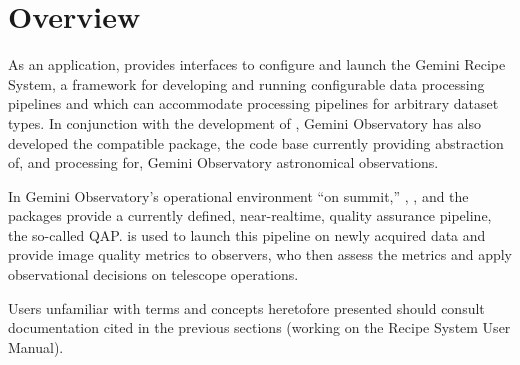 \documentclass[letterpaper,10pt,english]{sphinxmanual}
\begin{document}
\section{Overview}
\label{intro:overview}
As an application,  provides interfaces to configure and launch the
Gemini Recipe System, a framework for developing and running configurable data
processing pipelines and which can accommodate processing pipelines for arbitrary
dataset types. In conjunction with the development of , Gemini
Observatory has also developed the compatible  package, the
code base currently providing abstraction of, and processing for, Gemini
Observatory astronomical observations.

In Gemini Observatory's operational environment ``on summit,'' ,
, and the  packages provide a currently defined,
near-realtime, quality assurance pipeline, the so-called QAP.  is used
to launch this pipeline on newly acquired data and provide image quality metrics
to observers, who then assess the metrics and apply observational decisions on
telescope operations.

Users unfamiliar with terms and concepts heretofore presented should consult
documentation cited in the previous sections (working on the Recipe System User
Manual).
\end{document}
